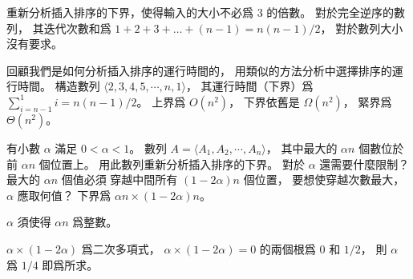 \startsection[
  title={\m{O}， \m{\Omega}， \m{\Theta} notation},
]

\startEXERCISE
重新分析插入排序的下界，使得輸入的大小不必爲 $3$ 的倍數。
\stopEXERCISE
\startANSWER
對於完全逆序的數列，
其迭代次數和爲 $1+2+3+\dots+(n-1)=n (n-1)/2$，
對於數列大小沒有要求。
\stopANSWER

\startEXERCISE
回顧我們是如何分析插入排序的運行時間的，
用類似的方法分析中選擇排序的運行時間。
\stopEXERCISE
\startANSWER
構造數列 $\langle 2,3,4,5,\cdots,n,1\rangle$，
其運行時間（下界）爲 $\sum_{i=n-1}^{1}i = n(n-1)/2$。
上界爲 $O(n^2)$，
下界依舊是 $\Omega(n^2)$，
緊界爲 $\Theta(n^2)$。
\stopANSWER

\startEXERCISE
有小數 $\alpha$ 滿足 $0<\alpha<1$。
數列 $A=\langle A_1,A_2,\cdots,A_n\rangle$，
其中最大的 $\alpha n$ 個數位於前 $\alpha n$ 個位置上。
用此數列重新分析插入排序的下界。
對於 $\alpha$ 還需要什麼限制？
最大的 $\alpha n$ 個值必須
穿越中間所有 $(1-2\alpha)n$ 個位置，
要想使穿越次數最大， $\alpha$ 應取何值？
\stopEXERCISE
\startANSWER
下界爲 $\alpha n \times (1-2\alpha)n$。

$\alpha$ 須使得 $\alpha n$ 爲整數。

$\alpha\times(1-2\alpha)$ 爲二次多項式，
$\alpha\times(1-2\alpha)=0$ 的兩個根爲 $0$ 和 $1/2$，
則 $\alpha$ 爲 $1/4$ 即爲所求。
\stopANSWER

\stopsection
